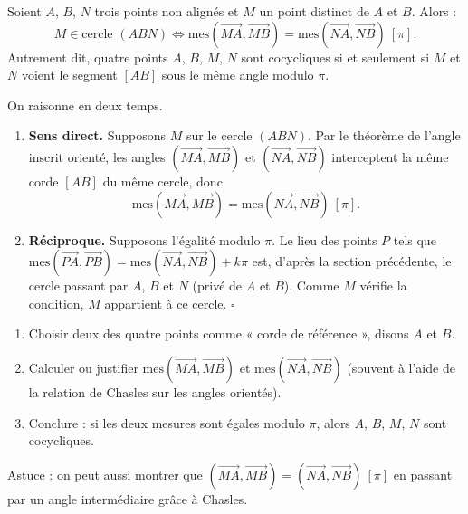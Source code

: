 \documentclass[11pt]{article}
\begin{document}
\begin{propriete}
Soient $A$, $B$, $N$ trois points non alignés et $M$ un point distinct de $A$ et $B$. Alors :
\[ M \in \text{cercle }(ABN) \iff \text{mes}(\overrightarrow{MA},\overrightarrow{MB}) = \text{mes}(\overrightarrow{NA},\overrightarrow{NB}) \ [\pi]. \]
Autrement dit, quatre points $A$, $B$, $M$, $N$ sont cocycliques si et seulement si $M$ et $N$ voient le segment $[AB]$ sous le même angle modulo $\pi$.
\end{propriete}

\begin{experience}
On raisonne en deux temps.
\begin{enumerate}
\item \textbf{Sens direct.} Supposons $M$ sur le cercle $(ABN)$. Par le théorème de l'angle inscrit orienté, les angles $(\overrightarrow{MA},\overrightarrow{MB})$ et $(\overrightarrow{NA},\overrightarrow{NB})$ interceptent la même corde $[AB]$ du même cercle, donc
\[ \text{mes}(\overrightarrow{MA},\overrightarrow{MB}) = \text{mes}(\overrightarrow{NA},\overrightarrow{NB}) \ [\pi]. \]
\item \textbf{Réciproque.} Supposons l'égalité modulo $\pi$. Le lieu des points $P$ tels que $\text{mes}(\overrightarrow{PA},\overrightarrow{PB}) = \text{mes}(\overrightarrow{NA},\overrightarrow{NB}) + k\pi$ est, d'après la section précédente, le cercle passant par $A$, $B$ et $N$ (privé de $A$ et $B$). Comme $M$ vérifie la condition, $M$ appartient à ce cercle. \hfill$\square$
\end{enumerate}
\end{experience}

\begin{methode}
\begin{enumerate}
\item Choisir deux des quatre points comme « corde de référence », disons $A$ et $B$.
\item Calculer ou justifier $\text{mes}(\overrightarrow{MA},\overrightarrow{MB})$ et $\text{mes}(\overrightarrow{NA},\overrightarrow{NB})$ (souvent à l'aide de la relation de Chasles sur les angles orientés).
\item Conclure : si les deux mesures sont égales modulo $\pi$, alors $A$, $B$, $M$, $N$ sont cocycliques.
\end{enumerate}
Astuce : on peut aussi montrer que $(\overrightarrow{MA},\overrightarrow{MB}) = (\overrightarrow{NA},\overrightarrow{NB}) \ [\pi]$ en passant par un angle intermédiaire grâce à Chasles.
\end{methode}
\end{document}
